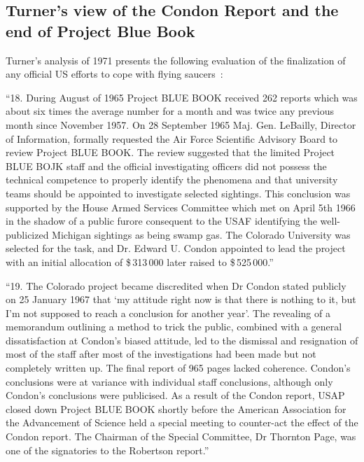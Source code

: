 \subsection{Turner's view of the Condon Report and the end of Project Blue Book}
\label{2023-UFO-part-Perception-types-USA-avecreopbb}

Turner's analysis of 1971
presents the following evaluation of the finalization of any official
US efforts to cope with flying saucers~\cite{TurnerAustralia1971}:
\begin{svgraybox}
``18. During August of 1965 Project BLUE BOOK received 262
reports which was about six times the average number for a month
and was twice any previous month since November 1957. On
28 September 1965 Maj. Gen. LeBailly, Director of Information,
formally requested the Air Force Scientific Advisory Board to
review Project BLUE BOOK. The review suggested that the limited
Project BLUE BOJK staff and the official investigating officers
did not possess the technical competence to properly identify the
phenomena and that university teams should be appointed to
investigate selected sightings. This conclusion was supported by
the House Armed Services Committee which met on April 5th 1966
in the shadow of a public furore consequent to the USAF identifying
the well-publicized Michigan sightings as being swamp gas. The
Colorado University was selected for the task, and Dr. Edward U. Condon
appointed to lead the project with an initial allocation of {\$}\,313\,000
later raised to {\$}\,525\,000.''

``19. The Colorado project became discredited when Dr Condon
stated publicly on 25 January 1967 that `my attitude right now
is that there is nothing to it, but I'm not supposed to reach a
conclusion for another year'. The revealing of a memorandum
outlining a method to trick the public, combined with a general
dissatisfaction at Condon's biased attitude, led to the dismissal
and resignation of most of the staff after most of the investigations
had been made but not completely written up. The final report of 965
pages lacked coherence. Condon's conclusions were at variance with
individual staff conclusions, although only Condon's conclusions were
publicised. As a result of the Condon report, USAP closed down
Project BLUE BOOK shortly before the American Association for the
Advancement of Science held a special meeting to counter-act the
effect of the Condon report. The Chairman of the Special Committee,
Dr Thornton Page, was one of the signatories to the Robertson report.''


\end{svgraybox}
